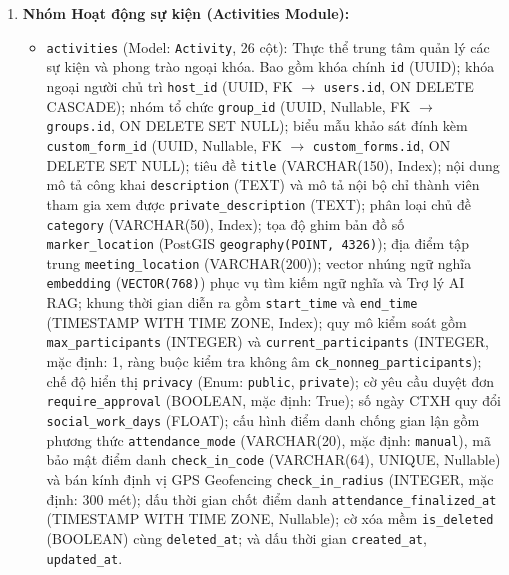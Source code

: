 \begin{enumerate}
    \item \textbf{Nhóm Hoạt động sự kiện (Activities Module):}
    \begin{itemize}
        \item \texttt{activities} (Model: \texttt{Activity}, 26 cột): Thực thể trung tâm quản lý các sự kiện và phong trào ngoại khóa. Bao gồm khóa chính \texttt{id} (UUID); khóa ngoại người chủ trì \texttt{host\_id} (UUID, FK $\rightarrow$ \texttt{users.id}, ON DELETE CASCADE); nhóm tổ chức \texttt{group\_id} (UUID, Nullable, FK $\rightarrow$ \texttt{groups.id}, ON DELETE SET NULL); biểu mẫu khảo sát đính kèm \texttt{custom\_form\_id} (UUID, Nullable, FK $\rightarrow$ \texttt{custom\_forms.id}, ON DELETE SET NULL); tiêu đề \texttt{title} (VARCHAR(150), Index); nội dung mô tả công khai \texttt{description} (TEXT) và mô tả nội bộ chỉ thành viên tham gia xem được \texttt{private\_description} (TEXT); phân loại chủ đề \texttt{category} (VARCHAR(50), Index); tọa độ ghim bản đồ số \texttt{marker\_location} (PostGIS \texttt{geography(POINT, 4326)}); địa điểm tập trung \texttt{meeting\_location} (VARCHAR(200)); vector nhúng ngữ nghĩa \texttt{embedding} (\texttt{VECTOR(768)}) phục vụ tìm kiếm ngữ nghĩa và Trợ lý AI RAG; khung thời gian diễn ra gồm \texttt{start\_time} và \texttt{end\_time} (TIMESTAMP WITH TIME ZONE, Index); quy mô kiểm soát gồm \texttt{max\_participants} (INTEGER) và \texttt{current\_participants} (INTEGER, mặc định: 1, ràng buộc kiểm tra không âm \texttt{ck\_nonneg\_participants}); chế độ hiển thị \texttt{privacy} (Enum: \texttt{public}, \texttt{private}); cờ yêu cầu duyệt đơn \texttt{require\_approval} (BOOLEAN, mặc định: True); số ngày CTXH quy đổi \texttt{social\_work\_days} (FLOAT); cấu hình điểm danh chống gian lận gồm phương thức \texttt{attendance\_mode} (VARCHAR(20), mặc định: \texttt{manual}), mã bảo mật điểm danh \texttt{check\_in\_code} (VARCHAR(64), UNIQUE, Nullable) và bán kính định vị GPS Geofencing \texttt{check\_in\_radius} (INTEGER, mặc định: 300 mét); dấu thời gian chốt điểm danh \texttt{attendance\_finalized\_at} (TIMESTAMP WITH TIME ZONE, Nullable); cờ xóa mềm \texttt{is\_deleted} (BOOLEAN) cùng \texttt{deleted\_at}; và dấu thời gian \texttt{created\_at}, \texttt{updated\_at}.
    \end{itemize}


\end{enumerate}
